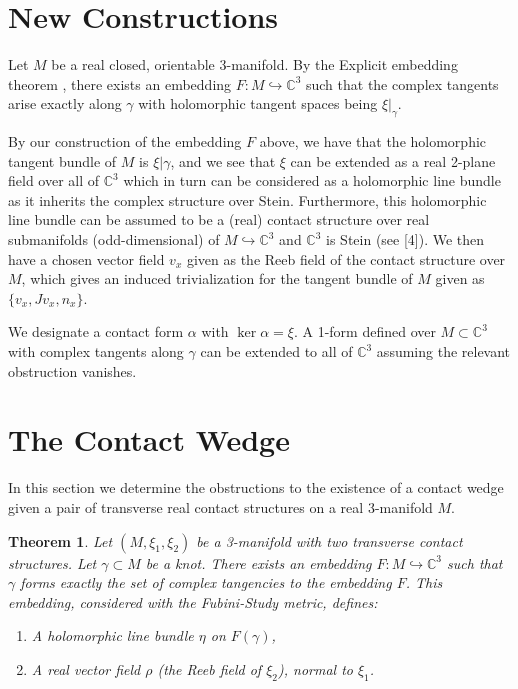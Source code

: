 \documentclass{amsart}
\newtheorem{theorem}{Theorem}
\newcommand{\C}{\mathbb{C}}
\begin{document}
\section{New Constructions}

Let $M$ be a real closed, orientable 3-manifold. By the Explicit embedding theorem \cite{Elgindi2025}, there exists an embedding $F: M \hookrightarrow \C^3$ such that the complex tangents arise exactly along $\gamma$ with holomorphic tangent spaces being $\xi|_\gamma$.

By our construction of the embedding $F$ above, we have that the holomorphic tangent bundle of $M$ is $\xi|\gamma$, and we see that $\xi$ can be extended as a real 2-plane field over all of $\C^3$ which in turn can be considered as a holomorphic line bundle as it inherits the complex structure over Stein. Furthermore, this holomorphic line bundle can be assumed to be a (real) contact structure over real submanifolds (odd-dimensional) of $M \hookrightarrow \C^3$ and $\C^3$ is Stein (see [4]). We then have a chosen vector field $v_x$ given as the Reeb field of the contact structure over $M$, which gives an induced trivialization for the tangent bundle of $M$ given as $\{v_x, Jv_x, n_x\}$.

We designate a contact form $\alpha$ with $\ker\alpha = \xi$. A 1-form defined over $M \subset \C^3$ with complex tangents along $\gamma$ can be extended to all of $\C^3$ assuming the relevant obstruction vanishes.

\section{The Contact Wedge}

In this section we determine the obstructions to the existence of a contact wedge given a pair of transverse real contact structures on a real 3-manifold $M$.

\begin{theorem}
Let $(M,\xi_1,\xi_2)$ be a 3-manifold with two transverse contact structures. Let $\gamma \subset M$ be a knot. There exists an embedding $F: M \hookrightarrow \C^3$ such that $\gamma$ forms exactly the set of complex tangencies to the embedding $F$. This embedding, considered with the Fubini-Study metric, defines:
\begin{enumerate}
\item A holomorphic line bundle $\eta$ on $F(\gamma)$,
\item A real vector field $\rho$ (the Reeb field of $\xi_2$), normal to $\xi_1$.
\end{enumerate}
\end{theorem}
\end{document}
